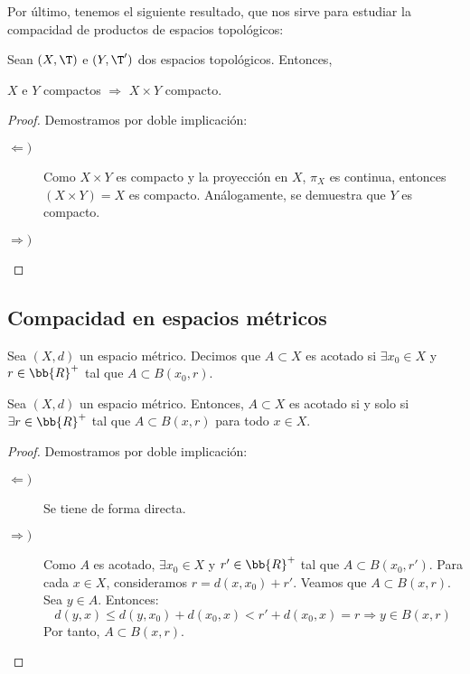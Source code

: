 Por último, tenemos el siguiente resultado, que nos sirve para estudiar la compacidad de productos de espacios topológicos:
\begin{teo}[Tychonoff] \label{teo:Tychonoff}
    Sean $(X,\T)$ e $(Y,\T')$ dos espacios topológicos. Entonces,
    \begin{center}
        $X$ e $Y$ compactos $\Longrightarrow$ $X\times Y$ compacto.
    \end{center}
\end{teo}
\begin{proof}
    Demostramos por doble implicación:
    \begin{description}
        \item[$\Longleftarrow)$] Como $X\times Y$ es compacto y la proyección en $X$, $\pi_X$ es continua, entonces $(X\times Y)=X$ es compacto.
        Análogamente, se demuestra que $Y$ es compacto.
        
        \item[$\Longrightarrow)$] %
    \end{description}
\end{proof}


\subsection{Compacidad en espacios métricos}

\begin{definicion}
    Sea $(X,d)$ un espacio métrico. Decimos que $A\subset X$ es acotado si $\exists x_0\in X$ y $r\in \bb{R}^+$ tal que $A\subset B(x_0,r)$.
\end{definicion}
\begin{lema}
    Sea $(X,d)$ un espacio métrico. Entonces, $A\subset X$ es acotado si y solo si $\exists r\in \bb{R}^+$ tal que $A\subset B(x,r)$ para todo $x\in X$.
\end{lema}
\begin{proof}
    Demostramos por doble implicación:
    \begin{description}
        \item[$\Longleftarrow)$] Se tiene de forma directa.
        \item[$\Longrightarrow)$] Como $A$ es acotado, $\exists x_0\in X$ y $r'\in \bb{R}^+$ tal que $A\subset B(x_0,r')$. Para cada $x\in X$, consideramos $r=d(x,x_0)+r'$.
        Veamos que $A\subset B(x,r)$. Sea $y\in A$. Entonces:
        \begin{equation*}
            d(y,x) \leq d(y,x_0) + d(x_0,x) < r' + d(x_0,x) = r \Longrightarrow y\in B(x,r)  
        \end{equation*}
        Por tanto, $A\subset B(x,r)$.  \qedhere
    \end{description}
\end{proof}


